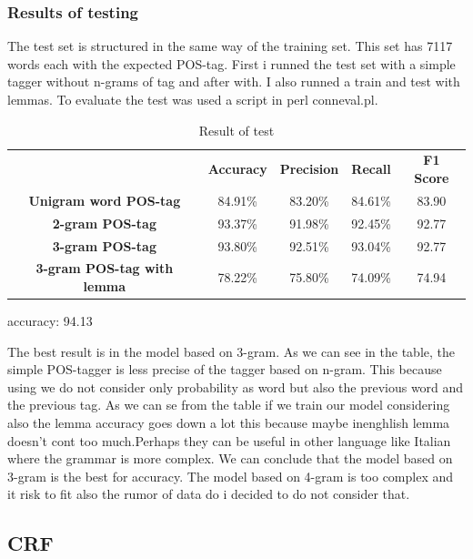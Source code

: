 \documentclass[a4paper,8pt,oneside]{article}
\begin{document}
		\subsubsection{Results of testing}
			The test set is structured in the same way of the training set. This set has 7117 words each with the expected POS-tag. First i runned the test set with a simple tagger without n-grams of tag and after with. I also runned a train and test with lemmas. To evaluate the test was used a script in perl conneval.pl.
			\begin{table}[h]
				\begin{tabular}{ccccc}
					& \textbf{Accuracy} & \textbf{Precision} & \textbf{Recall} & \textbf{F1 Score} \\
					\textbf{Unigram word POS-tag} & 84.91\%           & 83.20\%            & 84.61\%         & 83.90 \\
					\textbf{2-gram POS-tag}       & 93.37\%           & 91.98\%            & 92.45\%         & 92.77 \\
					\textbf{3-gram POS-tag}       & 93.80\%           & 92.51\%            & 93.04\%         & 92.77 \\
					\textbf{3-gram POS-tag with lemma}       & 78.22\%           & 75.80\%            & 74.09\%         & 74.94 \\
				\end{tabular}
				\caption{Result of test}
			\end{table}
			accuracy:  94.13%

			The best result is in the model based on 3-gram. As we can see in the table, the simple POS-tagger is less precise of the tagger based on n-gram. This because using we do not consider only probability as word but also the previous word and the previous tag. As we can se from the table if we train our model considering also the lemma accuracy goes down a lot this because maybe inenghlish lemma doesn't cont too much.Perhaps they can be useful in other language like Italian where the grammar is more complex. We can conclude that the model based on 3-gram is the best for accuracy. The model based on 4-gram is too complex and it risk to fit also the rumor of data do i decided to do not consider that.

	\subsection{CRF}
\end{document}
